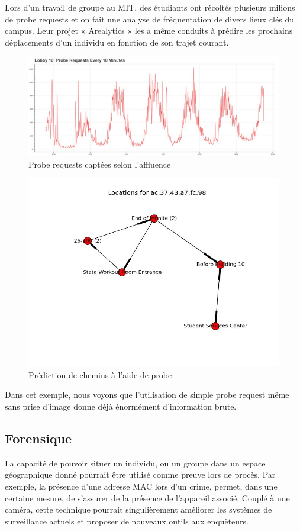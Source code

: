 Lors d’un travail de groupe au MIT, des étudiants ont récoltés plusieurs milions de probe requests et on fait une
analyse de fréquentation de divers lieux clés du campus. Leur projet « Arealytics » les a même conduits à prédire
les prochains déplacements d’un individu en fonction de son trajet courant.
\begin{figure}[H]
	\centering
	\includegraphics[width=16cm]{images/etude-legi-1.jpg}
	\caption{Probe requests captées selon l'affluence}
	\label{fig:arealytics-graph}
\end{figure}
\begin{figure}[H]
	\centering
	\includegraphics[width=12cm]{images/etude-legi-2.jpg}
	\caption{Prédiction de chemins à l'aide de probe}
	\label{fig:arealytics-path}
\end{figure}

Dans cet exemple, nous voyons que l’utilisation de simple probe request même sans prise d’image donne déjà
énormément d’information brute.

\subsection{Forensique}
La capacité de pouvoir situer un individu, ou un groupe dans un espace géographique donné pourrait être utilisé
comme preuve lors de procès. Par exemple, la présence d’une adresse MAC lors d’un crime, permet, dans une certaine mesure, 
de s’assurer de la présence de l’appareil associé. Couplé à une caméra, cette technique pourrait
singulièrement améliorer les systèmes de surveillance actuels et proposer de nouveaux outils aux enquêteurs.

